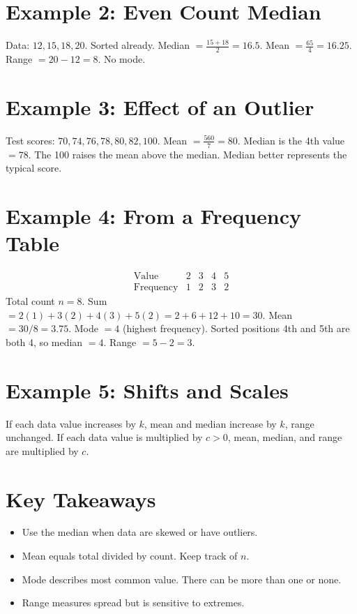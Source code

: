 \documentclass[14pt]{extarticle}
\begin{document}
\section*{Example 2: Even Count Median}

Data: \(12, 15, 18, 20\). Sorted already.  
Median \(=\frac{15+18}{2}=16.5\).  
Mean \(=\frac{65}{4}=16.25\). Range \(=20-12=8\). No mode.

\section*{Example 3: Effect of an Outlier}

Test scores: \(70, 74, 76, 78, 80, 82, 100\).  
Mean \(=\frac{560}{7}=80\). Median is the 4th value \(=78\).  
The 100 raises the mean above the median. Median better represents the typical score.

\section*{Example 4: From a Frequency Table}

\[
\begin{array}{c|cccc}
\text{Value} & 2 & 3 & 4 & 5\\ \hline
\text{Frequency} & 1 & 2 & 3 & 2
\end{array}
\]
Total count \(n=8\). Sum \(=2(1)+3(2)+4(3)+5(2)=2+6+12+10=30\).  
Mean \(=30/8=3.75\). Mode \(=4\) (highest frequency).  
Sorted positions 4th and 5th are both 4, so median \(=4\). Range \(=5-2=3\).

\section*{Example 5: Shifts and Scales}

If each data value increases by \(k\), mean and median increase by \(k\), range unchanged.  
If each data value is multiplied by \(c>0\), mean, median, and range are multiplied by \(c\).

\section*{Key Takeaways}
\begin{itemize}
  \item Use the median when data are skewed or have outliers.
  \item Mean equals total divided by count. Keep track of \(n\).
  \item Mode describes most common value. There can be more than one or none.
  \item Range measures spread but is sensitive to extremes.
\end{itemize}
\end{document}
